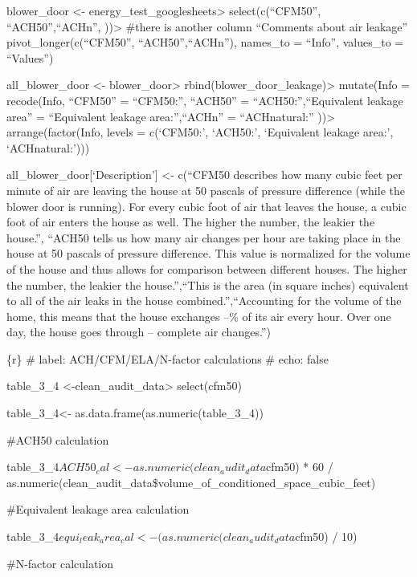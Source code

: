 \documentclass[
  letterpaper,
  DIV=11,
  numbers=noendperiod]{scrartcl}
\begin{document}
blower\_door \textless- energy\_test\_googlesheets\textbar\textgreater{}
select(c(``CFM50'', ``ACH50'',``ACHn'', ))\textbar\textgreater{} \#there
is another column ``Comments about air leakage''
pivot\_longer(c(``CFM50'', ``ACH50'',``ACHn''), names\_to = ``Info'',
values\_to = ``Values'')

all\_blower\_door \textless- blower\_door\textbar\textgreater{}
rbind(blower\_door\_leakage)\textbar\textgreater{} mutate(Info =
recode(Info, ``CFM50'' = ``CFM50:'', ``ACH50'' = ``ACH50:'',``Equivalent
leakage area'' = ``Equivalent leakage area:'',``ACHn'' = ``ACHnatural:''
))\textbar\textgreater{} arrange(factor(Info, levels = c(`CFM50:',
`ACH50:', `Equivalent leakage area:', `ACHnatural:')))

all\_blower\_door{[}`Description'{]} \textless- c(``CFM50 describes how
many cubic feet per minute of air are leaving the house at 50 pascals of
pressure difference (while the blower door is running). For every cubic
foot of air that leaves the house, a cubic foot of air enters the house
as well. The higher the number, the leakier the house.'', ``ACH50 tells
us how many air changes per hour are taking place in the house at 50
pascals of pressure difference. This value is normalized for the volume
of the house and thus allows for comparison between different houses.
The higher the number, the leakier the house.'',``This is the area (in
square inches) equivalent to all of the air leaks in the house
combined.'',``Accounting for the volume of the home, this means that the
house exchanges --\% of its air every hour. Over one day, the house goes
through -- complete air changes.'')

\{r\} \#\textbar{} label: ACH/CFM/ELA/N-factor calculations \#\textbar{}
echo: false

table\_3\_4 \textless-clean\_audit\_data\textbar\textgreater{}
select(cfm50)

table\_3\_4\textless- as.data.frame(as.numeric(table\_3\_4))

\#ACH50 calculation

table\_3\_4\(ACH50_cal <- as.numeric(clean_audit_data\)cfm50) * 60 /
as.numeric(clean\_audit\_data\$volume\_of\_conditioned\_space\_cubic\_feet)

\#Equivalent leakage area calculation

table\_3\_4\(equi_leak_area_cal <- (as.numeric(clean_audit_data\)cfm50)
/ 10)

\#N-factor calculation
\end{document}
